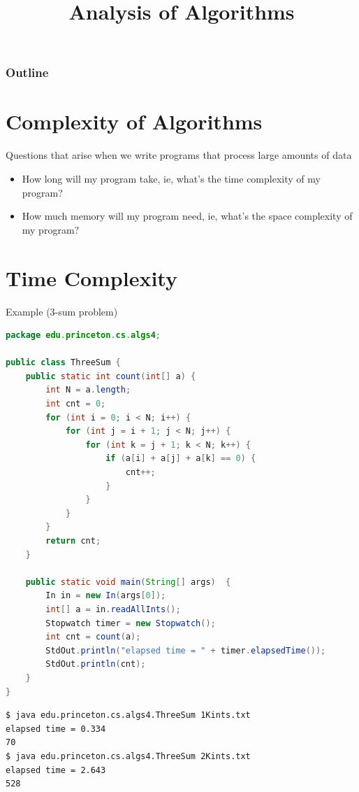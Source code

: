 \documentclass[8pt,a4paper,compress]{beamer}
\title{Analysis of Algorithms}
\date{}
\begin{document}
\begin{frame}
\vfill
\titlepage
\end{frame}

\begin{frame}
\frametitle{Outline}
\tableofcontents
\end{frame}

\section{Complexity of Algorithms}
\begin{frame}[fragile]
\pause

Questions that arise when we write programs that process large amounts of data
\begin{itemize}
\item How long will my program take, ie, what's the time complexity of my program?
\item How much memory will my program need, ie, what's the space complexity of my program?
\end{itemize}
\end{frame}

\section{Time Complexity}
\begin{frame}[fragile]
\pause

Example (3-sum problem)
\begin{lstlisting}[language=Java]
package edu.princeton.cs.algs4;

public class ThreeSum {
    public static int count(int[] a) {
        int N = a.length;
        int cnt = 0;
        for (int i = 0; i < N; i++) {
            for (int j = i + 1; j < N; j++) {
                for (int k = j + 1; k < N; k++) {
                    if (a[i] + a[j] + a[k] == 0) { 
                        cnt++; 
                    }
                }
            }
        }
        return cnt;
    }
    
    public static void main(String[] args)  { 
        In in = new In(args[0]);
        int[] a = in.readAllInts();
        Stopwatch timer = new Stopwatch();
        int cnt = count(a);
        StdOut.println("elapsed time = " + timer.elapsedTime());
        StdOut.println(cnt);
    } 
}
\end{lstlisting}

\pause

\begin{lstlisting}[language={}]
$ java edu.princeton.cs.algs4.ThreeSum 1Kints.txt 
elapsed time = 0.334
70
$ java edu.princeton.cs.algs4.ThreeSum 2Kints.txt 
elapsed time = 2.643
528
\end{lstlisting}
\end{frame}
\end{document}
